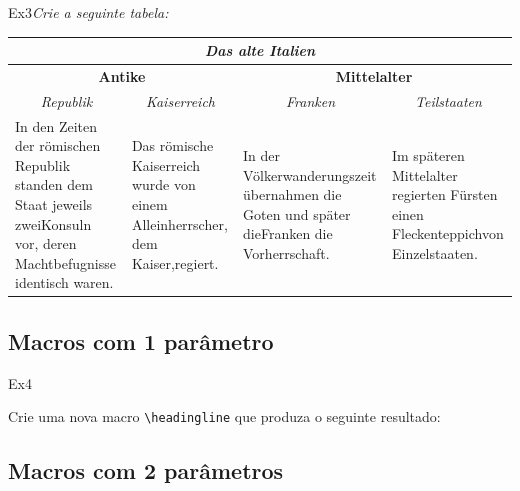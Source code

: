 \begin{texercise}{Ex3}\textit{Crie a seguinte tabela:}\par\smallskip%
\begin{tcboutputlisting}
\begin{tabular}{|p{3cm}|p{3cm}|p{3cm}|p{3cm}|}\hline
\multicolumn{4}{|c|}{\bfseries\itshape Das alte Italien}\\\hline
\multicolumn{2}{|c|}{\bfseries Antike} &
\multicolumn{2}{c|}{\bfseries Mittelalter}\\\hline
\multicolumn{1}{|c|}{\itshape Republik}&
\multicolumn{1}{c|}{\itshape Kaiserreich}&
\multicolumn{1}{c|}{\itshape Franken}&
\multicolumn{1}{c|}{\itshape Teilstaaten}\\\hline
In den Zeiten der r\"{o}mischen Republik standen dem Staat jeweils zweiKonsuln vor, deren Machtbefugnisse identisch waren. &
Das r\"{o}mische Kaiserreich wurde von einem Alleinherrscher, dem Kaiser,regiert.& 
In der V\"{o}lkerwanderungszeit \"{u}bernahmen die Goten und sp\"{a}ter dieFranken die Vorherrschaft.& 
Im sp\"{a}teren Mittelalter regierten F\"{u}rsten einen Fleckenteppichvon Einzelstaaten.\\\hline
\end{tabular}
\end{tcboutputlisting}
\tcbuselistingtext%
\end{texercise}

\subsection*{Macros com 1 parâmetro}
\label{sec:exec_macros_1_par}

\begin{texercise}{Ex4}
\begin{tcboutputlisting}
\newcommand{\headingline}[1]{%
    \begin{center}\Large\bfseries #1\end{center}}
\end{tcboutputlisting}
\tcbuselistingtext%
Crie uma nova macro \verb+\headingline+ que produza o seguinte resultado:\par\smallskip
\begin{tcbwritetemp}
\end{tcbwritetemp}\tcbusetemplisting\tcbusetemp%
\end{texercise}

\subsection*{Macros com 2 parâmetros}
\label{sec:exec_macros_2_par}

